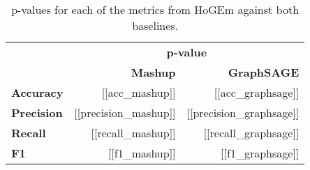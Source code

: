 \begin{table}[t]
    \centering
    \begin{tabular}{lrr}
         & \multicolumn{2}{c}{\textbf{p-value}} \\ \cline{2-3}
         & \textbf{Mashup} & \textbf{GraphSAGE} \\ \hline
        \textbf{Accuracy}  & [[acc_mashup]] & [[acc_graphsage]] \\ \hline
        \textbf{Precision} & [[precision_mashup]] & [[precision_graphsage]] \\ \hline
        \textbf{Recall}    & [[recall_mashup]] & [[recall_graphsage]] \\ \hline
        \textbf{F1}        & [[f1_mashup]] & [[f1_graphsage]] \\ \hline
    \end{tabular}
    \caption{p-values for each of the metrics from HoGEm against both baselines. \label{table:pValues}}
\end{table}